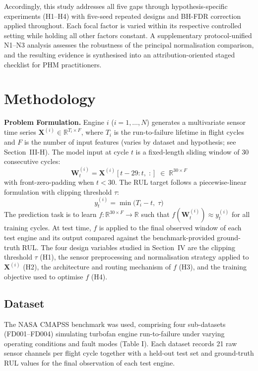 \documentclass[preprint,10pt]{elsarticle}
\begin{document}
Accordingly, this study addresses all five gaps through hypothesis-specific experiments (H1--H4) with five-seed repeated designs and BH-FDR correction applied throughout. Each focal factor is varied within its respective controlled setting while holding all other factors constant. A supplementary protocol-unified N1--N3 analysis assesses the robustness of the principal normalisation comparison, and the resulting evidence is synthesised into an attribution-oriented staged checklist for PHM practitioners.

\section{Methodology}

\noindent\textbf{Problem Formulation.} Engine $i$ ($i = 1, \ldots, N$) generates a multivariate sensor time series $\mathbf{X}^{(i)} \in \mathbb{R}^{T_i \times F}$, where $T_i$ is the run-to-failure lifetime in flight cycles and $F$ is the number of input features (varies by dataset and hypothesis; see Section~III-H). The model input at cycle $t$ is a fixed-length sliding window of 30 consecutive cycles:
\begin{equation}
  \mathbf{W}_t^{(i)} = \mathbf{X}^{(i)}[t{-}29:t,\;:] \;\in\; \mathbb{R}^{30 \times F}
  \label{eq:window}
\end{equation}
with front-zero-padding when $t < 30$. The RUL target follows a piecewise-linear formulation with clipping threshold $\tau$:
\begin{equation}
  y_t^{(i)} = \min\!\bigl(T_i - t,\;\tau\bigr)
  \label{eq:rul}
\end{equation}
The prediction task is to learn $f : \mathbb{R}^{30 \times F} \to \mathbb{R}$ such that $f(\mathbf{W}_t^{(i)}) \approx y_t^{(i)}$ for all training cycles. At test time, $f$ is applied to the final observed window of each test engine and its output compared against the benchmark-provided ground-truth RUL. The four design variables studied in Section~IV are the clipping threshold $\tau$ (H1), the sensor preprocessing and normalisation strategy applied to $\mathbf{X}^{(i)}$ (H2), the architecture and routing mechanism of $f$ (H3), and the training objective used to optimise $f$ (H4).

\subsection{Dataset}

The NASA CMAPSS benchmark was used, comprising four sub-datasets (FD001–FD004) simulating turbofan engine run-to-failure under varying operating conditions and fault modes (Table I). Each dataset records 21 raw sensor channels per flight cycle together with a held-out test set and ground-truth RUL values for the final observation of each test engine.
\end{document}
